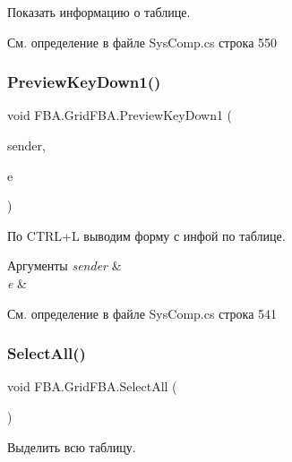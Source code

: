 Показать информацию о таблице. 

См. определение в файле Sys\+Comp.\+cs строка 550

\mbox{\label{class_f_b_a_1_1_grid_f_b_a_a0463f19d3f7bb46245cc928c088023e9}} 
\subsubsection{\texorpdfstring{Preview\+Key\+Down1()}{PreviewKeyDown1()}}
{\footnotesize\ttfamily void F\+B\+A.\+Grid\+F\+B\+A.\+Preview\+Key\+Down1 (\begin{DoxyParamCaption}\item[{object}]{sender,  }\item[{Preview\+Key\+Down\+Event\+Args}]{e }\end{DoxyParamCaption})\hspace{0.3cm}{\ttfamily [protected]}}



По C\+T\+R\+L+L выводим форму с инфой по таблице. 


\begin{DoxyParams}{Аргументы}
{\em sender} & \\
\hline
{\em e} & \\
\hline
\end{DoxyParams}


См. определение в файле Sys\+Comp.\+cs строка 541

\mbox{\label{class_f_b_a_1_1_grid_f_b_a_acb10ddc9ad434e7966a2eb2fbfc594b9}} 
\subsubsection{\texorpdfstring{Select\+All()}{SelectAll()}}
{\footnotesize\ttfamily void F\+B\+A.\+Grid\+F\+B\+A.\+Select\+All (\begin{DoxyParamCaption}{ }\end{DoxyParamCaption})}



Выделить всю таблицу. 

